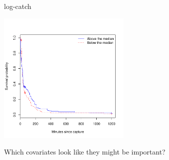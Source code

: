 \documentclass[envcountsect, 10pt, portrait, palatino]{beamer}
\begin{document}
\begin{frame}
\begin{center}
log-catch\\
\centerline{\includegraphics[width=2.5in]{logcatch.pdf}}
\end{center}
Which covariates look like they might be important?
\end{frame}
\end{document}
